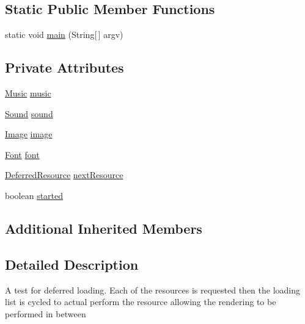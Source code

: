 \subsection*{Static Public Member Functions}
\begin{DoxyCompactItemize}
\item 
static void \mbox{\hyperlink{classorg_1_1newdawn_1_1slick_1_1tests_1_1_deferred_loading_test_af6d4a365f606666656f28290663b3260}{main}} (String\mbox{[}$\,$\mbox{]} argv)
\end{DoxyCompactItemize}
\subsection*{Private Attributes}
\begin{DoxyCompactItemize}
\item 
\mbox{\hyperlink{classorg_1_1newdawn_1_1slick_1_1_music}{Music}} \mbox{\hyperlink{classorg_1_1newdawn_1_1slick_1_1tests_1_1_deferred_loading_test_aeee6a2a60464117e0720a20f1245475b}{music}}
\item 
\mbox{\hyperlink{classorg_1_1newdawn_1_1slick_1_1_sound}{Sound}} \mbox{\hyperlink{classorg_1_1newdawn_1_1slick_1_1tests_1_1_deferred_loading_test_a8172e419d67fc261237d5700437448b2}{sound}}
\item 
\mbox{\hyperlink{classorg_1_1newdawn_1_1slick_1_1_image}{Image}} \mbox{\hyperlink{classorg_1_1newdawn_1_1slick_1_1tests_1_1_deferred_loading_test_abfa4e4fd5420ec7ae5ace4b864ce4399}{image}}
\item 
\mbox{\hyperlink{interfaceorg_1_1newdawn_1_1slick_1_1_font}{Font}} \mbox{\hyperlink{classorg_1_1newdawn_1_1slick_1_1tests_1_1_deferred_loading_test_af451c5e232ab4145044ecec9c379abdc}{font}}
\item 
\mbox{\hyperlink{interfaceorg_1_1newdawn_1_1slick_1_1loading_1_1_deferred_resource}{Deferred\+Resource}} \mbox{\hyperlink{classorg_1_1newdawn_1_1slick_1_1tests_1_1_deferred_loading_test_a0031535ae6851e2d9a26ee37f2db573b}{next\+Resource}}
\item 
boolean \mbox{\hyperlink{classorg_1_1newdawn_1_1slick_1_1tests_1_1_deferred_loading_test_aca1a456477bfe9014edfc279d8428c01}{started}}
\end{DoxyCompactItemize}
\subsection*{Additional Inherited Members}


\subsection{Detailed Description}
A test for deferred loading. Each of the resources is requested then the loading list is cycled to actual perform the resource allowing the rendering to be performed in between

